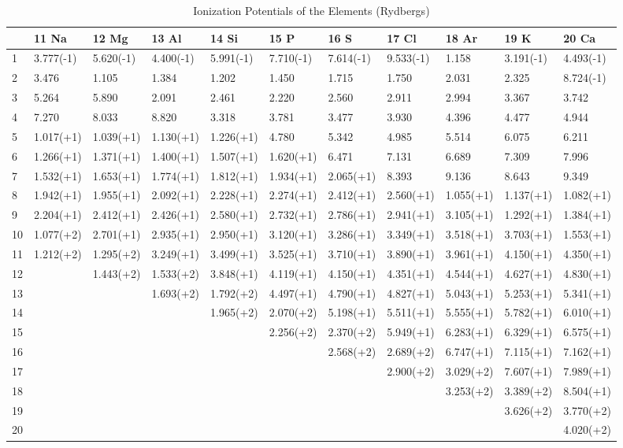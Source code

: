 \begin{table}
\scriptsize
\caption{Ionization Potentials of the Elements (Rydbergs)}
\begin{tabular}{lllllllllll}
\hline
&11 Na& 12 Mg& 13 Al& 14 Si& 15 P&16 S& 17 Cl& 18 Ar& 19 K& 20 Ca\\
\hline
1&
3.777(-1)&5.620(-1)&4.400(-1)&5.991(-1)&7.710(-1)&7.614(-1)&9.533(-1)&1.158&
3.191(-1)&4.493(-1)\\
2& 3.476& 1.105& 1.384& 1.202& 1.450& 1.715& 1.750& 2.031& 2.325&
8.724(-1)\\
3& 5.264& 5.890& 2.091& 2.461& 2.220& 2.560& 2.911& 2.994& 3.367& 3.742\\
4& 7.270&
8.033& 8.820& 3.318& 3.781& 3.477& 3.930& 4.396& 4.477& 4.944\\
5& 1.017(+1)& 1.039(+1)& 1.130(+1)& 1.226(+1)& 4.780& 5.342& 4.985& 5.514&
6.075& 6.211\\
6& 1.266(+1)& 1.371(+1)& 1.400(+1)& 1.507(+1)& 1.620(+1)& 6.471& 7.131&
6.689& 7.309& 7.996\\
7& 1.532(+1)& 1.653(+1)& 1.774(+1)& 1.812(+1)& 1.934(+1)& 2.065(+1)& 8.393&
9.136& 8.643&
9.349\\
8& 1.942(+1)& 1.955(+1)& 2.092(+1)& 2.228(+1)& 2.274(+1)& 2.412(+1)&
2.560(+1)& 1.055(+1)& 1.137(+1)& 1.082(+1)\\
9& 2.204(+1)& 2.412(+1)& 2.426(+1)& 2.580(+1)& 2.732(+1)& 2.786(+1)&
2.941(+1)& 3.105(+1)& 1.292(+1)& 1.384(+1)\\
10& 1.077(+2)& 2.701(+1)& 2.935(+1)& 2.950(+1)& 3.120(+1)& 3.286(+1)&
3.349(+1)& 3.518(+1)& 3.703(+1)& 1.553(+1)\\
11& 1.212(+2)& 1.295(+2)& 3.249(+1)& 3.499(+1)& 3.525(+1)& 3.710(+1)&
3.890(+1)& 3.961(+1)& 4.150(+1)& 4.350(+1)\\
12&& 1.443(+2)& 1.533(+2)& 3.848(+1)& 4.119(+1)& 4.150(+1)& 4.351(+1)&
4.544(+1)& 4.627(+1)& 4.830(+1)\\
13&&&  1.693(+2)& 1.792(+2)& 4.497(+1)& 4.790(+1)& 4.827(+1)& 5.043(+1)&
5.253(+1)& 5.341(+1)\\
14&&&& 1.965(+2)& 2.070(+2)& 5.198(+1)& 5.511(+1)& 5.555(+1)& 5.782(+1)&
6.010(+1)\\
15&&&&& 2.256(+2)& 2.370(+2)& 5.949(+1)& 6.283(+1)& 6.329(+1)& 6.575(+1)\\
16&&&&&& 2.568(+2)& 2.689(+2)& 6.747(+1)& 7.115(+1)& 7.162(+1)\\
17&&&&&&& 2.900(+2)& 3.029(+2)& 7.607(+1)& 7.989(+1)\\
18&&&&&&&& 3.253(+2)& 3.389(+2)& 8.504(+1)\\
19&&&&&&&&& 3.626(+2)& 3.770(+2)\\
20&&&&&&&&&& 4.020(+2)\\
\hline
\end{tabular}
\end{table}

